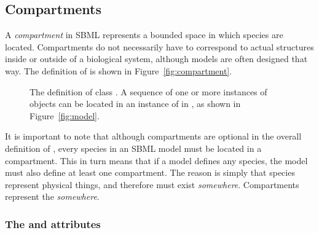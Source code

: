 \subsection{Compartments}
\label{sec:compartments}

A \emph{compartment} in SBML represents a bounded space in which
species are located.  Compartments do not necessarily have to
correspond to actual structures inside or outside of a biological
system, although models are often designed that way.  The definition
of \Compartment is shown in Figure~\vref{fig:compartment}.

\begin{figure}[htb]
  \centering
  \small
  \caption{The definition of class \Compartment.  A
      sequence of one or more instances of \Compartment objects
      can be located in an instance of \ListOfCompartments in
      \Model, as shown in Figure~\protect\ref{fig:model}.}
  \label{fig:compartment}
\end{figure}

It is important to note that although compartments are optional in
the overall definition of \Model, every species in an SBML model
must be located in a compartment.  This in turn means that if a
model defines any species, the model must also define at least one
compartment.  The reason is simply that species represent physical
things, and therefore must exist \emph{somewhere}.  Compartments
represent the \emph{somewhere}.


\subsubsection{The  and  attributes}

